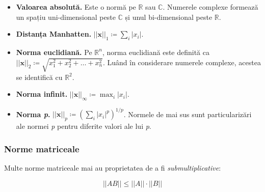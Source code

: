 \documentclass{exam}
\begin{document}
\begin{itemize}
	\item \textbf{Valoarea absolută.} Este o normă pe $\mathbb{R}$ sau
	      $\mathbb{C}$. Numerele complexe formează un spațiu uni-dimensional
	      peste $\mathbb{C}$ și unul bi-dimensional peste $\mathbb{R}$.
	\item \textbf{Distanța Manhatten.} $||\mathbf{x}||_1 \coloneq \sum_{i} |x_i| $.
	\item \textbf{Norma euclidiană.} Pe $\mathbb{R}^n$, norma euclidiană este
	      definită ca $||\mathbf{x}||_2 \coloneq \sqrt{x_1^2 + x_2^2 + \ldots + x_n^2}$. Luând
	      în considerare numerele complexe, acestea se identifică cu $\mathbb{R}^2$.
	\item \textbf{Norma infinit.} $||\mathbf{x}||_{\infty} \coloneq \max_i |x_i|$.
	\item \textbf{Norma \textit{p}.} $||\mathbf{x}||_p \coloneq \left( \sum_{i} |x_i|^p \right)^{1/p}$.
	      Normele de mai sus sunt particularizări ale normei \textit{p} pentru diferite valori ale lui \textit{p}.

\end{itemize}

\subsubsection{Norme matriceale}

\par Multe norme matriceale mai au proprietatea de a fi \textit{submultiplicative}:

\begin{equation*}
	||AB|| \leq ||A|| \cdot ||B||
\end{equation*}
\end{document}
